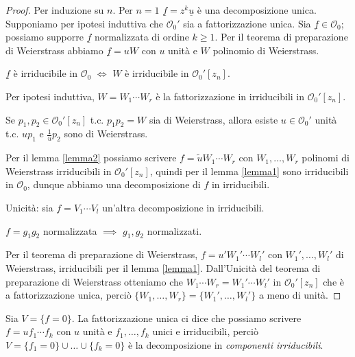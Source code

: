 \begin{proof}
  Per induzione su $n$. Per $n=1$ $\underline{f}=z^k\underline{u}$ è una decomposizione unica. Supponiamo per ipotesi induttiva che $\mathcal{O}_0'$ sia a fattorizzazione unica. Sia $\underline{f} \in \mathcal{O}_0$; possiamo supporre $\underline{f}$ normalizzata di ordine $k \ge 1$. Per il teorema di preparazione di Weierstrass abbiamo $\underline{f}=uW$ con $u$ unità e $W$ polinomio di Weierstrass.

  \begin{lm} \label{lemma1}
    $\underline{f}$ è irriducibile in $\mathcal{O}_0$ $\iff$ $W$ è irriducibile in $\mathcal{O}_0'[z_n]$.
  \end{lm}

  Per ipotesi induttiva, $W=W_1\cdots W_r$ è la fattorizzazione in irriducibili in $\mathcal{O}_0'[z_n]$.

  \begin{lm} \label{lemma2}
    Se $p_1, p_2 \in \mathcal{O}_0'[z_n]$ t.c. $p_1p_2=W$ sia di Weierstrass, allora esiste $u \in \mathcal{O}_0'$ unità t.c. $up_1$ e $\frac{1}{u}p_2$ sono di Weierstrass.
  \end{lm}

  Per il lemma \ref{lemma2} possiamo scrivere $f=\tilde{u}W_1\cdots W_r$ con $W_1, \dots, W_r$ polinomi di Weierstrass irriducibili in $\mathcal{O}_0'[z_n]$, quindi per il lemma \ref{lemma1} sono irriducibili in $\mathcal{O}_0$, dunque abbiamo una decomposizione di $f$ in irriducibili.

  Unicità: sia $f=V_1\cdots V_l$ un'altra decomposizione in irriducibili.

  \begin{lm} \label{lemma3}
    $f=g_1g_2$ normalizzata $\implies$ $g_1,g_2$ normalizzati.
  \end{lm}

  Per il teorema di preparazione di Weierstrass, $f=u'W_1'\cdots W_l'$ con $W_1', \dots, W_l'$ di Weierstrass, irriducibili per il lemma \ref{lemma1}. Dall'Unicità del teorema di preparazione di Weierstrass otteniamo che $W_1\cdots W_r=W_1'\cdots W_l'$ in $\mathcal{O}_0'[z_n]$ che è a fattorizzazione unica, perciò $\{W_1,\dots,W_r\}=\{W_1',\dots,W_l'\}$ a meno di unità.
\end{proof}

\begin{oss}
  Sia $V=\{f=0\}$. La fattorizzazione unica ci dice che possiamo scrivere $f=uf_1\cdots f_k$ con $u$ unità e $f_1, \dots, f_k$ unici e irriducibili, perciò $V=\{f_1=0\}\cup\dots\cup\{f_k=0\}$ è la decomposizione in \textit{componenti irriducibili}.
\end{oss}

